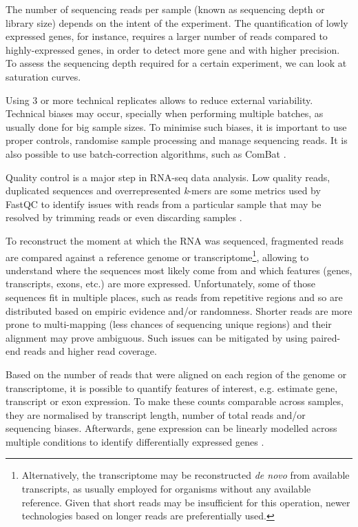 The number of sequencing reads per sample (known as sequencing depth or library size) depends on the intent of the experiment. The quantification of lowly expressed genes, for instance, requires a larger number of reads compared to highly-expressed genes, in order to detect more gene and with higher precision. To assess the sequencing depth required for a certain experiment, we can look at saturation curves.

Using 3 or more technical replicates allows to reduce external variability. Technical biases may occur, specially when performing multiple batches, as usually done for big sample sizes. To minimise such biases, it is important to use proper controls, randomise sample processing and manage sequencing reads. It is also possible to use batch-correction algorithms, such as ComBat \cite{johnson:2006tj,zhang:2020uq}.

Quality control is a major step in RNA-seq data analysis. Low quality reads, duplicated sequences and overrepresented \emph{k}-mers are some metrics used by FastQC to identify issues with reads from a particular sample that may be resolved by trimming reads or even discarding samples \cite{andrews:2019vg}. %

To reconstruct the moment at which the RNA was sequenced, fragmented reads are compared against a reference genome or transcriptome\footnote{Alternatively, the transcriptome may be reconstructed \emph{de novo} from available transcripts, as usually employed for organisms without any available reference. Given that short reads may be insufficient for this operation, newer technologies based on longer reads are preferentially used.}, allowing to understand where the sequences most likely come from and which features (genes, transcripts, exons, etc.) are more expressed. Unfortunately, some of those sequences fit in multiple places, such as reads from repetitive regions and so are distributed based on empiric evidence and/or randomness. Shorter reads are more prone to multi-mapping (less chances of sequencing unique regions) and their alignment may prove ambiguous. Such issues can be mitigated by using paired-end reads and higher read coverage.

Based on the number of reads that were aligned on each region of the genome or transcriptome, it is possible to quantify features of interest, e.g. estimate gene, transcript or exon expression. To make these counts comparable across samples, they are normalised by transcript length, number of total reads and/or sequencing biases. Afterwards, gene expression can be linearly modelled across multiple conditions to identify differentially expressed genes \cite{conesa:2016vw}.

